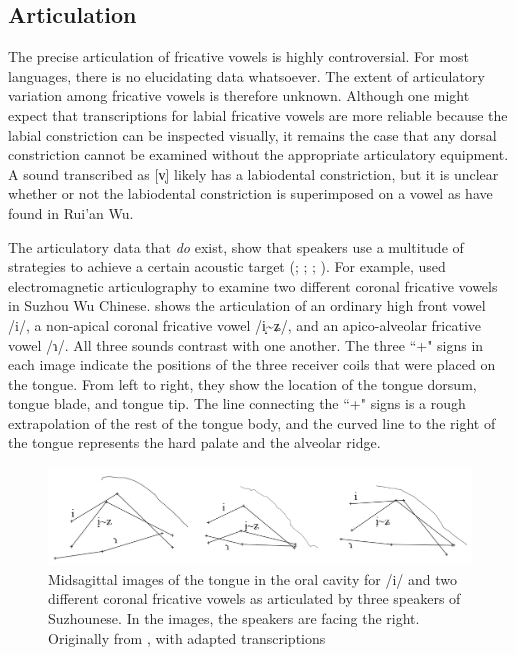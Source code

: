 \documentclass[output=paper,colorlinks,citecolor=brown,chinesefont]{langscibook}
\begin{document}
\subsection{Articulation}
The precise articulation of fricative vowels is highly controversial. For most languages, there is no elucidating data whatsoever. The extent of articulatory variation among fricative vowels is therefore unknown. Although one might expect that transcriptions for labial fricative vowels are more reliable because the labial constriction can be inspected visually, it remains the case that any dorsal constriction cannot be examined without the appropriate articulatory equipment. A sound transcribed as [v̩] likely has a labiodental constriction, but it is unclear whether or not the labiodental constriction is superimposed on a vowel as \citet{Hu&He_2019} have found in Rui'an Wu.

The articulatory data that \textit{do} exist, show that speakers use a multitude of strategies to achieve a certain acoustic target (\cite{faytak&lin_2015}; \cite{Faytak_2018}; \cite{shao_2020}; \cite{westerberg_2020}). For example, \citet{Hu&Ling_2019} used electromagnetic articulography to examine two different coronal fricative vowels in Suzhou Wu Chinese.  shows the articulation of an ordinary high front vowel /i/, a non-apical coronal fricative vowel /i̝{\textasciitilde}ʑ/, and an apico-alveolar fricative vowel /ɿ/. All three sounds contrast with one another. The three ``+" signs in each image indicate the positions of the three receiver coils that were placed on the tongue. From left to right, they show the location of the tongue dorsum, tongue blade, and tongue tip. The line connecting the ``+" signs is a rough extrapolation of the rest of the tongue body, and the curved line to the right of the tongue represents the hard palate and the alveolar ridge.

\begin{figure}
    \includegraphics[width=\textwidth]{figures/EMA_Hu&Ling_edited.png}
    \caption{Midsagittal images of the tongue in the oral cavity for /i/ and two different coronal fricative vowels as articulated by three speakers of Suzhounese. In the images, the speakers are facing the right. Originally from \citet[10]{Hu&Ling_2019}, with adapted transcriptions}
    \label{fig:EMA_Hu&Ling}
\end{figure}
\end{document}
